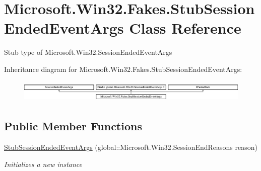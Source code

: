 \hypertarget{class_microsoft_1_1_win32_1_1_fakes_1_1_stub_session_ended_event_args}{\section{Microsoft.\-Win32.\-Fakes.\-Stub\-Session\-Ended\-Event\-Args Class Reference}
\label{class_microsoft_1_1_win32_1_1_fakes_1_1_stub_session_ended_event_args}
}


Stub type of Microsoft.\-Win32.\-Session\-Ended\-Event\-Args 


Inheritance diagram for Microsoft.\-Win32.\-Fakes.\-Stub\-Session\-Ended\-Event\-Args\-:\begin{figure}[H]
\begin{center}
\leavevmode
\includegraphics[height=1.082126cm]{class_microsoft_1_1_win32_1_1_fakes_1_1_stub_session_ended_event_args}
\end{center}
\end{figure}
\subsection*{Public Member Functions}
\begin{DoxyCompactItemize}
\item 
\hyperlink{class_microsoft_1_1_win32_1_1_fakes_1_1_stub_session_ended_event_args_ad2db9c6bdd6adbf4d24460e1156f92c6}{Stub\-Session\-Ended\-Event\-Args} (global\-::\-Microsoft.\-Win32.\-Session\-End\-Reasons reason)
\begin{DoxyCompactList}\small\item\em Initializes a new instance\end{DoxyCompactList}\end{DoxyCompactItemize}
